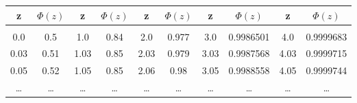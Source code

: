 \documentclass{standalone}
\begin{document}
\centering
\begin{tabular}{c | c || c | c || c | c || c | c || c | c}
z & $ \Phi(z) $ & z & $\Phi(z)$ & z & $\Phi(z)$ & z & $\Phi(z)$ & z & $\Phi(z)$ \\
\hline

&&&&&&&&&\\

0.0     &       0.5     &       1.0     &       0.84    &       2.0     &       0.977   &       3.0     &       0.9986501       &       4.0     &       0.9999683       \\
0.03    &       0.51    &       1.03    &       0.85    &       2.03    &       0.979   &       3.03    &       0.9987568       &       4.03    &       0.9999715       \\
0.05    &       0.52    &       1.05    &       0.85    &       2.06    &       0.98    &       3.05    &       0.9988558       &       4.05    &       0.9999744       \\

\dots & \dots & \dots & \dots & \dots & \dots & \dots & \dots & \dots & \dots \\ 

\end{tabular}
\end{document}
